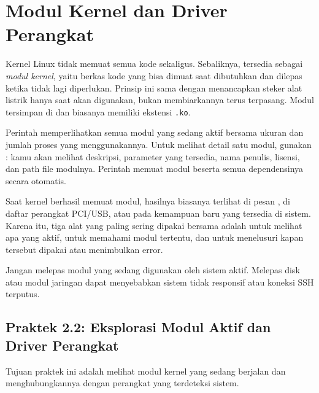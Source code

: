\section{Modul Kernel dan Driver Perangkat}
\label{sec:kernel-modules}

Kernel Linux tidak memuat semua kode  sekaligus. Sebaliknya,  tersedia sebagai \textit{modul kernel}, yaitu berkas kode yang bisa dimuat saat dibutuhkan dan dilepas ketika tidak lagi diperlukan. Prinsip ini sama dengan menancapkan steker alat listrik hanya saat akan digunakan, bukan membiarkannya terus terpasang. Modul tersimpan di  dan biasanya memiliki ekstensi \texttt{.ko}.

Perintah  memperlihatkan semua modul yang sedang aktif bersama ukuran dan jumlah proses yang menggunakannya. Untuk melihat detail satu modul, gunakan : kamu akan melihat deskripsi, parameter yang tersedia, nama penulis, lisensi, dan path file modulnya. Perintah  memuat modul beserta semua dependensinya secara otomatis.

Saat kernel berhasil memuat modul, hasilnya biasanya terlihat di pesan , di daftar perangkat PCI/USB, atau pada kemampuan baru yang tersedia di sistem. Karena itu, tiga alat yang paling sering dipakai bersama adalah  untuk melihat apa yang aktif,  untuk memahami modul tertentu, dan  untuk menelusuri kapan  tersebut dipakai atau menimbulkan error.

\begin{warningbox}
Jangan melepas modul yang sedang digunakan oleh sistem aktif. Melepas  disk atau modul jaringan dapat menyebabkan sistem tidak responsif atau koneksi SSH terputus.
\end{warningbox}

\subsection*{Praktek 2.2: Eksplorasi Modul Aktif dan Driver Perangkat}

Tujuan praktek ini adalah melihat modul kernel yang sedang berjalan dan menghubungkannya dengan perangkat yang terdeteksi sistem.

